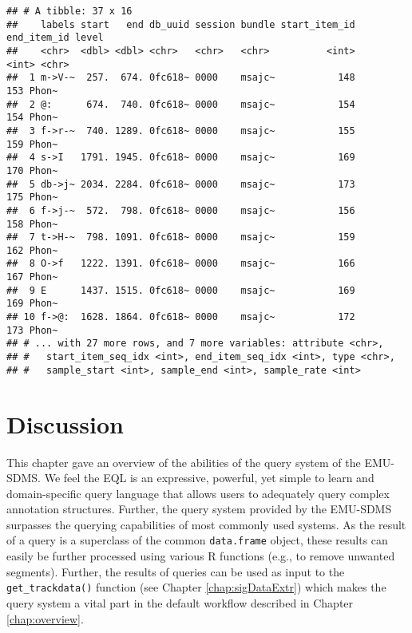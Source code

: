 \documentclass[
]{book}
\begin{document}
\begin{verbatim}
## # A tibble: 37 x 16
##    labels start   end db_uuid session bundle start_item_id end_item_id level
##    <chr>  <dbl> <dbl> <chr>   <chr>   <chr>          <int>       <int> <chr>
##  1 m->V-~  257.  674. 0fc618~ 0000    msajc~           148         153 Phon~
##  2 @:      674.  740. 0fc618~ 0000    msajc~           154         154 Phon~
##  3 f->r-~  740. 1289. 0fc618~ 0000    msajc~           155         159 Phon~
##  4 s->I   1791. 1945. 0fc618~ 0000    msajc~           169         170 Phon~
##  5 db->j~ 2034. 2284. 0fc618~ 0000    msajc~           173         175 Phon~
##  6 f->j-~  572.  798. 0fc618~ 0000    msajc~           156         158 Phon~
##  7 t->H-~  798. 1091. 0fc618~ 0000    msajc~           159         162 Phon~
##  8 O->f   1222. 1391. 0fc618~ 0000    msajc~           166         167 Phon~
##  9 E      1437. 1515. 0fc618~ 0000    msajc~           169         169 Phon~
## 10 f->@:  1628. 1864. 0fc618~ 0000    msajc~           172         173 Phon~
## # ... with 27 more rows, and 7 more variables: attribute <chr>,
## #   start_item_seq_idx <int>, end_item_seq_idx <int>, type <chr>,
## #   sample_start <int>, sample_end <int>, sample_rate <int>
\end{verbatim}

\hypertarget{discussion}{%
\section{Discussion}\label{discussion}}

This chapter gave an overview of the abilities of the query system of the EMU-SDMS. We feel the EQL is an expressive, powerful, yet simple to learn and domain-specific query language that allows users to adequately query complex annotation structures. Further, the query system provided by the EMU-SDMS surpasses the querying capabilities of most commonly used systems. As the result of a query is a superclass of the common \texttt{data.frame} object, these results can easily be further processed using various R functions (e.g., to remove unwanted segments). Further, the results of queries can be used as input to the \texttt{get\_trackdata()} function (see Chapter \ref{chap:sigDataExtr}) which makes the query system a vital part in the default workflow described in Chapter \ref{chap:overview}.
\end{document}
